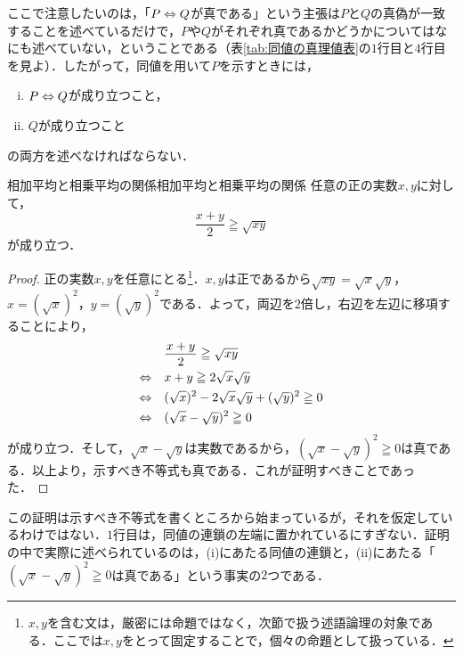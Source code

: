 ここで注意したいのは，「$P \mathrel{\Leftrightarrow} Q$が真である」という主張は$P$と$Q$の真偽が一致することを述べているだけで，$P$や$Q$がそれぞれ真であるかどうかについてはなにも述べていない，ということである（表\ref{tab:同値の真理値表}の$1$行目と$4$行目を見よ）．したがって，同値を用いて$P$を示すときには，
\begin{enumerate}[(i)]
  \item $P \mathrel{\Leftrightarrow} Q$が成り立つこと，
  \item $Q$が成り立つこと
\end{enumerate}
の両方を述べなければならない．

\begin{prop}{相加平均と相乗平均の関係}{相加平均と相乗平均の関係}
  任意の正の実数$x,y$に対して，
  \[
    \frac{x + y}{2} \geqq \sqrt{xy}
  \]
  が成り立つ．
\end{prop}

\begin{tleftbar}
  \begin{proof}
    正の実数$x,y$を任意にとる\footnote{$x,y$を含む文は，厳密には命題ではなく，次節で扱う述語論理の対象である．ここでは$x,y$をとって固定することで，個々の命題として扱っている．}．$x,y$は正であるから$\sqrt{xy} = \sqrt{x}\sqrt{y}$，$x = (\sqrt{x})^2$，$y = (\sqrt{y})^2$である．よって，両辺を$2$倍し，右辺を左辺に移項することにより，
    \begin{align*}
                        & \frac{x + y}{2} \geqq \sqrt{xy}                       \\
      \lequiv \quad     & x + y \geqq 2\sqrt{x}\sqrt{y}                         \\
      \lequiv \quad     & (\sqrt{x})^2 - 2\sqrt{x}\sqrt{y} + (\sqrt{y})^2 \geqq 0 \\
      \lequiv \quad     & (\sqrt{x} - \sqrt{y})^2 \geqq 0
    \end{align*}
    が成り立つ．そして，$\sqrt{x} - \sqrt{y}$は実数であるから，$(\sqrt{x} - \sqrt{y})^2 \geqq 0$は真である．以上より，示すべき不等式も真である．これが証明すべきことであった．
  \end{proof}
\end{tleftbar}

この証明は示すべき不等式を書くところから始まっているが，それを仮定しているわけではない．$1$行目は，同値の連鎖の左端に置かれているにすぎない．証明の中で実際に述べられているのは，(i)にあたる同値の連鎖と，(ii)にあたる「$(\sqrt{x} - \sqrt{y})^2 \geqq 0$は真である」という事実の$2$つである．

